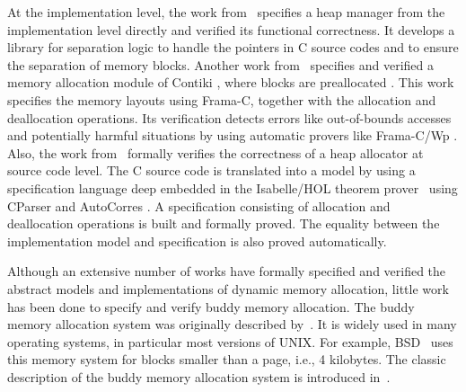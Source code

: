 At the implementation level, the work from~\cite{reg_marti} specifies a heap manager from the implementation level directly and verified its functional correctness. It develops a library for separation logic to handle the pointers in C source codes and to ensure the separation of memory blocks. Another work from~\cite{reg_mangano} specifies and verified a memory allocation module of Contiki , where blocks are preallocated . This work specifies the memory layouts using Frama-C, together with the allocation and deallocation operations. Its verification detects errors like out-of-bounds accesses and potentially harmful situations by using automatic provers like Frama-C/Wp . Also, the work from~\cite{reg_sahebolamri} formally verifies the correctness of a heap allocator at source code level. The C source code is translated into a model by using a specification language deep embedded in the Isabelle/HOL theorem prover~\cite{reg_Isabelle/HOL} using CParser and AutoCorres . A specification  consisting of allocation and deallocation operations  is built and formally proved. The equality  between the implementation model and specification is also proved automatically.

 Although an extensive number of works have formally specified and verified the abstract models and implementations of dynamic memory allocation, little  work has been done to specify and verify buddy memory allocation. The buddy memory allocation system was originally described by~\cite{reg_knowlton}. It is widely used in many operating systems, in particular most versions of UNIX. For example, BSD~\cite{reg_mckusick} uses this memory system for blocks smaller than a page, i.e., 4 kilobytes. The classic description  of the buddy memory allocation system is introduced in~\cite{reg_knuth}. 

